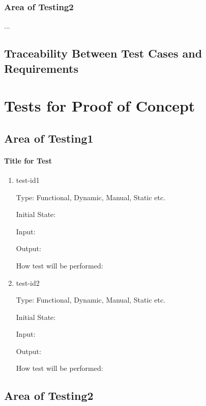 \documentclass[12pt, titlepage]{article}
\begin{document}
\subsubsection{Area of Testing2}

...

\subsection{Traceability Between Test Cases and Requirements}

\section{Tests for Proof of Concept}

\subsection{Area of Testing1}
		
\paragraph{Title for Test}

\begin{enumerate}

\item{test-id1\\}

Type: Functional, Dynamic, Manual, Static etc.
					
Initial State: 
					
Input: 
					
Output: 
					
How test will be performed: 
					
\item{test-id2\\}

Type: Functional, Dynamic, Manual, Static etc.
					
Initial State: 
					
Input: 
					
Output: 
					
How test will be performed: 

\end{enumerate}

\subsection{Area of Testing2}
\end{document}
